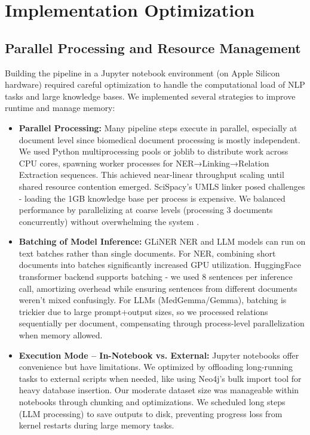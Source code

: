 \section{Implementation Optimization}
\label{sec:optimization}

\subsection{Parallel Processing and Resource Management}

Building the pipeline in a Jupyter notebook environment (on Apple Silicon hardware) required careful optimization to handle the computational load of NLP tasks and large knowledge bases. We implemented several strategies to improve runtime and manage memory:

\begin{itemize}
\item \textbf{Parallel Processing:} Many pipeline steps execute in parallel, especially at document level since biomedical document processing is mostly independent. We used Python multiprocessing pools or joblib to distribute work across CPU cores, spawning worker processes for NER→Linking→Relation Extraction sequences. This achieved near-linear throughput scaling until shared resource contention emerged. SciSpacy's UMLS linker posed challenges - loading the 1GB knowledge base per process is expensive. We balanced performance by parallelizing at coarse levels (processing 3 documents concurrently) without overwhelming the system \parencite{McKerns2021}.

\item \textbf{Batching of Model Inference:} GLiNER NER and LLM models can run on text batches rather than single documents. For NER, combining short documents into batches significantly increased GPU utilization. HuggingFace transformer backend supports batching - we used 8 sentences per inference call, amortizing overhead while ensuring sentences from different documents weren't mixed confusingly. For LLMs (MedGemma/Gemma), batching is trickier due to large prompt+output sizes, so we processed relations sequentially per document, compensating through process-level parallelization when memory allowed.

\item \textbf{Execution Mode – In-Notebook vs. External:} Jupyter notebooks offer convenience but have limitations. We optimized by offloading long-running tasks to external scripts when needed, like using Neo4j's bulk import tool for heavy database insertion. Our moderate dataset size was manageable within notebooks through chunking and optimizations. We scheduled long steps (LLM processing) to save outputs to disk, preventing progress loss from kernel restarts during large memory tasks.
\end{itemize}

